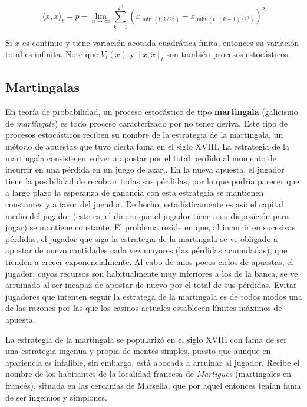 \documentclass[12pt,]{krantz}
\theoremstyle{definition}
\theoremstyle{definition}
\theoremstyle{definition}
\theoremstyle{remark}
\begin{document}
\begin{equation}
\langle x,x\rangle_t = p-\lim_{n\to\infty}\sum_{k=1}^{2^n}\left(x_{\min(t,k/2^n)} - x_{\min(t,(k-1)/2^n)}\right)^2
\label{eq:eq-variacion-acotada-proceso-2}
\end{equation}

Si \(x\) es continuo y tiene variación acotada cuadrática finita,
entonces su variación total es infinita. Note que \(V_t(x)\) y
\([x,x]_t\) son también procesos estocásticos.

\subsection{Martingalas}\label{martingalas}

En teoría de probabilidad, un proceso estocástico de tipo
\textbf{martingala} (galicismo de \emph{martingale}) es todo proceso
caracterizado por no tener deriva. Este tipo de procesos estocásticos
reciben su nombre de la estrategia de la martingala, un método de
apuestas que tuvo cierta fama en el siglo XVIII. La estrategia de la
martingala consiste en volver a apostar por el total perdido al momento
de incurrir en una pérdida en un juego de azar,. En la nueva apuesta, el
jugador tiene la posibilidad de recobrar todas sus pérdidas, por lo que
podría parecer que a largo plazo la esperanza de ganancia con esta
estrategia se mantienen constantes y a favor del jugador. De hecho,
estadísticamente es así: el capital medio del jugador (esto es, el
dinero que el jugador tiene a su disposición para jugar) se mantiene
constante. El problema reside en que, al incurrir en sucesivas pérdidas,
el jugador que siga la estrategia de la martingala se ve obligado a
apostar de nuevo cantidades cada vez mayores (las pérdidas acumuladas),
que tienden a crecer exponencialmente. Al cabo de unos pocos ciclos de
apuestas, el jugador, cuyos recursos son habitualmente muy inferiores a
los de la banca, se ve arruinado al ser incapaz de apostar de nuevo por
el total de sus pérdidas. Evitar jugadores que intenten seguir la
estratega de la martingala es de todos modos una de las razones por las
que los casinos actuales establecen límites máximos de apuesta.

La estrategia de la martingala se popularizó en el siglo XVIII con fama
de ser una estrategia ingenua y propia de mentes simples, puesto que
aunque en apariencia es infalible, sin embargo, está abocada a arruinar
al jugador. Recibe el nombre de los habitantes de la localidad francesa
de \emph{Martigues} (martingales en francés), situada en las cercanías
de Marsella, que por aquel entonces tenían fama de ser ingenuos y
simplones.
\end{document}
